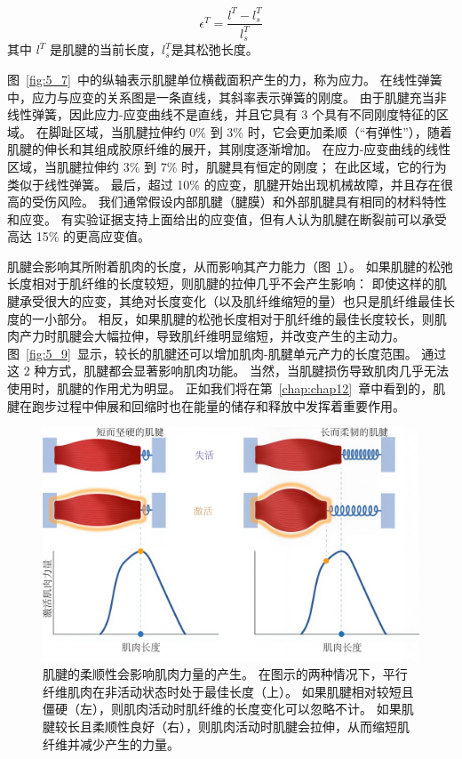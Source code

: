 \begin{equation}
	\epsilon^T = \frac{l^T - l_s^T}{l_s^T} 
	\label{eq:5_5}
\end{equation}
% 
其中 $l^T$ 是肌腱的当前长度，$l_s^T$是其松弛长度。


图~\ref{fig:5_7}~中的纵轴表示肌腱单位横截面积产生的力，称为应力。
在线性弹簧中，应力与应变的关系图是一条直线，其斜率表示弹簧的刚度。
由于肌腱充当非线性弹簧，因此应力-应变曲线不是直线，并且它具有 3 个具有不同刚度特征的区域。
在脚趾区域，当肌腱拉伸约 0\% 到 3\% 时，它会更加柔顺（“有弹性”），随着肌腱的伸长和其组成胶原纤维的展开，其刚度逐渐增加。
在应力-应变曲线的线性区域，当肌腱拉伸约 3\% 到 7\% 时，肌腱具有恒定的刚度；
在此区域，它的行为类似于线性弹簧。
最后，超过 10\% 的应变，肌腱开始出现机械故障，并且存在很高的受伤风险。
我们通常假设内部肌腱（腱膜）和外部肌腱具有相同的材料特性和应变。
有实验证据支持上面给出的应变值，但有人认为肌腱在断裂前可以承受高达 15\% 的更高应变值。


肌腱会影响其所附着肌肉的长度，从而影响其产力能力（图~\ref{fig:5_8}）。
如果肌腱的松弛长度相对于肌纤维的长度较短，则肌腱的拉伸几乎不会产生影响：
即使这样的肌腱承受很大的应变，其绝对长度变化（以及肌纤维缩短的量）也只是肌纤维最佳长度的一小部分。
相反，如果肌腱的松弛长度相对于肌纤维的最佳长度较长，则肌肉产力时肌腱会大幅拉伸，导致肌纤维明显缩短，并改变产生的主动力。
图~\ref{fig:5_9}~显示，较长的肌腱还可以增加肌肉-肌腱单元产力的长度范围。
通过这 2 种方式，肌腱都会显著影响肌肉功能。
当然，当肌腱损伤导致肌肉几乎无法使用时，肌腱的作用尤为明显。
正如我们将在第~\ref{chap:chap12}~章中看到的，肌腱在跑步过程中伸展和回缩时也在能量的储存和释放中发挥着重要作用。


\begin{figure}[!htb]
	\centering
	\includegraphics[width=1.0\linewidth]{chap5/5_8}
	\caption{肌腱的柔顺性会影响肌肉力量的产生。
		在图示的两种情况下，平行纤维肌肉在非活动状态时处于最佳长度（上）。
		如果肌腱相对较短且僵硬（左），则肌肉活动时肌纤维的长度变化可以忽略不计。
		如果肌腱较长且柔顺性良好（右），则肌肉活动时肌腱会拉伸，从而缩短肌纤维并减少产生的力量。 \label{fig:5_8}}
\end{figure}


